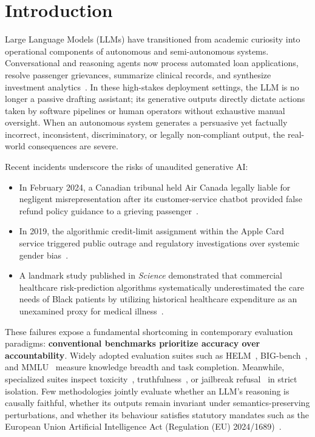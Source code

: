 \documentclass[conference]{IEEEtran}
\begin{document}
\section{Introduction}
\label{sec:introduction}

Large Language Models (LLMs) have transitioned from academic curiosity into operational components of autonomous and semi-autonomous systems. Conversational and reasoning agents now process automated loan applications, resolve passenger grievances, summarize clinical records, and synthesize investment analytics~\cite{bommasani2021opportunities, achiam2023gpt}. In these high-stakes deployment settings, the LLM is no longer a passive drafting assistant; its generative outputs directly dictate actions taken by software pipelines or human operators without exhaustive manual oversight. When an autonomous system generates a persuasive yet factually incorrect, inconsistent, discriminatory, or legally non-compliant output, the real-world consequences are severe.

Recent incidents underscore the risks of unaudited generative AI:
\begin{itemize}
    \item In February 2024, a Canadian tribunal held Air Canada legally liable for negligent misrepresentation after its customer-service chatbot provided false refund policy guidance to a grieving passenger~\cite{moffatt2024aircanada}.
    \item In 2019, the algorithmic credit-limit assignment within the Apple Card service triggered public outrage and regulatory investigations over systemic gender bias~\cite{nydfs2021applecard}.
    \item A landmark study published in \emph{Science} demonstrated that commercial healthcare risk-prediction algorithms systematically underestimated the care needs of Black patients by utilizing historical healthcare expenditure as an unexamined proxy for medical illness~\cite{obermeyer2019dissecting}.
\end{itemize}

These failures expose a fundamental shortcoming in contemporary evaluation paradigms: \textbf{conventional benchmarks prioritize accuracy over accountability}. Widely adopted evaluation suites such as HELM~\cite{liang2023helm}, BIG-bench~\cite{srivastava2023bigbench}, and MMLU~\cite{hendrycks2021mmlu} measure knowledge breadth and task completion. Meanwhile, specialized suites inspect toxicity~\cite{gehman2020realtoxicityprompts}, truthfulness~\cite{lin2022truthfulqa}, or jailbreak refusal~\cite{mazeika2024harmbench} in strict isolation. Few methodologies jointly evaluate whether an LLM's reasoning is causally faithful, whether its outputs remain invariant under semantics-preserving perturbations, and whether its behaviour satisfies statutory mandates such as the European Union Artificial Intelligence Act (Regulation (EU) 2024/1689)~\cite{eu2024ai-act}.
\end{document}
